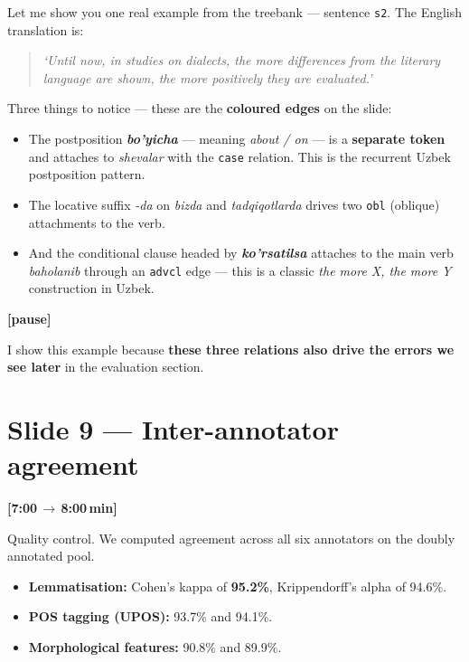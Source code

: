 \documentclass[12pt,a4paper]{article}
\newcommand{\timing}[2]{%
   \par\noindent\textbf{\small [#1\,$\to$\,#2\,min]}\par\vspace{0.2em}}
\newcommand{\say}[1]{\textbf{#1}}
\newcommand{\pause}{\par\vspace{0.4em}\textbf{[pause]}\par}
\begin{document}
Let me show you one real example from the treebank — sentence
\texttt{s2}. The English translation is:

\begin{quote}
\textit{`Until now, in studies on dialects, the more differences from the
literary language are shown, the more positively they are evaluated.'}
\end{quote}

\noindent
Three things to notice — these are the \textbf{coloured edges} on the slide:

\begin{itemize}
   \item The postposition \say{\textit{bo'yicha}} — meaning \textit{about / on} —
         is a \textbf{separate token} and attaches to \textit{shevalar} with the
         \texttt{case} relation. This is the recurrent Uzbek
         postposition pattern.
   \item The locative suffix \textit{-da} on \textit{bizda} and \textit{tadqiqotlarda}
         drives two \texttt{obl} (oblique) attachments to the verb.
   \item And the conditional clause headed by \say{\textit{ko'rsatilsa}} attaches
         to the main verb \textit{baholanib} through an \texttt{advcl} edge —
         this is a classic \textit{the more X, the more Y} construction in Uzbek.
\end{itemize}

\pause

I show this example because \textbf{these three relations also drive the
errors we see later} in the evaluation section.

\section*{Slide 9 — Inter-annotator agreement}
\timing{7:00}{8:00}

Quality control. We computed agreement across all six annotators on the
doubly annotated pool.

\begin{itemize}
   \item \textbf{Lemmatisation:} Cohen's kappa of \textbf{95.2\%}, Krippendorff's alpha of 94.6\%.
   \item \textbf{POS tagging (UPOS):} 93.7\% and 94.1\%.
   \item \textbf{Morphological features:} 90.8\% and 89.9\%.
\end{itemize}
\end{document}
